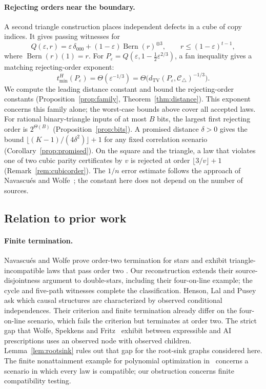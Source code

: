 \documentclass[11pt]{article}
\theoremstyle{plain}
\theoremstyle{definition}
\DeclareMathOperator{\Bern}{Bern}
\DeclareMathOperator{\TV}{TV}
\newcommand{\Ctri}{\mathcal C_{\triangle}}
\newcommand{\eps}{\varepsilon}
\newcommand{\tmin}{t_{\min}}
\begin{document}
\paragraph{Rejecting orders near the boundary.}
A second triangle construction places independent defects in a cube of copy indices. It gives passing witnesses for
\[
Q(\eps,r)=\eps\,\delta_{000}+(1-\eps)\Bern(r)^{\otimes3},
\qquad r\le(1-\eps)^{t-1},
\]
where $\Bern(r)(1)=r$. For $P_\eps=Q(\eps,1-\tfrac12\eps^{2/3})$, a fan inequality gives a matching rejecting-order exponent:
\[
\tmin^H(P_\eps)=\Theta(\eps^{-1/3})
=\Theta\bigl(d_{\TV}(P_\eps,\Ctri)^{-1/3}\bigr).
\]
We compute the leading distance constant and bound the rejecting-order constants (Proposition~\ref{prop:family}, Theorem~\ref{thm:distance}). This exponent concerns this family alone; the worst-case bounds above cover all accepted laws. For rational binary-triangle inputs of at most $B$ bits, the largest first rejecting order is $2^{\Theta(B)}$ (Proposition~\ref{prop:bits}). A promised distance $\delta>0$ gives the bound $\lfloor(K-1)/(4\delta^2)\rfloor+1$ for any fixed correlation scenario (Corollary~\ref{prop:promised}). On the square and the triangle, a law that violates one of two cubic parity certificates by $v$ is rejected at order $\lfloor3/v\rfloor+1$ (Remark~\ref{rem:cubicorder}). The $1/n$ error estimate follows the approach of Navascués and Wolfe~\cite[Theorem 1]{NW2020}; the constant here does not depend on the number of sources.

\subsection{Relation to prior work}\label{sec:prior}

\paragraph{Finite termination.}
Navascués and Wolfe prove order-two termination for stars and exhibit triangle-incompatible laws that pass order two \cite[Section 4.1]{NW2020}. Our reconstruction extends their source-disjointness argument to double-stars, including their four-on-line example; the cycle and five-path witnesses complete the classification. Henson, Lal and Pusey~\cite{HensonLalPusey2014} ask which causal structures are characterized by observed conditional independences. Their criterion and finite termination already differ on the four-on-line scenario, which fails the criterion but terminates at order two. The strict gap that Wolfe, Spekkens and Fritz~\cite{WSF2019} exhibit between expressible and AI prescriptions uses an observed node with observed children. Lemma~\ref{lem:rootsink} rules out that gap for the root-sink graphs considered here. The finite nonattainment example for polynomial optimization in~\cite{NW2020} concerns a scenario in which every law is compatible; our obstruction concerns finite compatibility testing.
\end{document}
